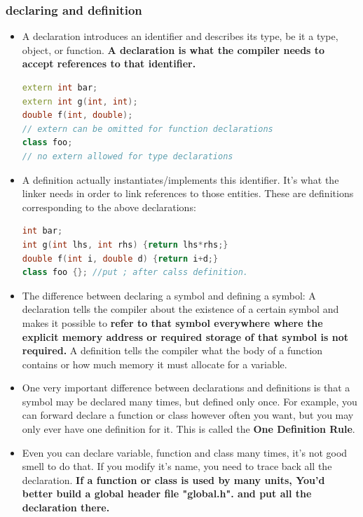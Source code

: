 \documentclass[a4paper,12pt,twoside]{book}
\begin{document}
\subsubsection{declaring and definition}
\begin{itemize}

\item A declaration introduces an identifier and describes its type, be it a type, object, or function. \textbf{A declaration is what the compiler needs to accept references to that identifier.} 
\begin{lstlisting}[frame=single, language=c++]
extern int bar;
extern int g(int, int);
double f(int, double); 
// extern can be omitted for function declarations
class foo; 
// no extern allowed for type declarations
\end{lstlisting}

\item A definition actually instantiates/implements this identifier. It's what the linker needs in order to link references to those entities. These are definitions corresponding to the above declarations:
\begin{lstlisting}[frame=single, language=c++]
int bar;
int g(int lhs, int rhs) {return lhs*rhs;}
double f(int i, double d) {return i+d;}
class foo {}; //put ; after calss definition.
\end{lstlisting}

\item The difference between declaring a symbol and defining a symbol: A declaration tells the compiler about the existence of a certain symbol and makes it possible to \textbf{refer to that symbol everywhere where the explicit memory address or required storage of that symbol is not required.} A definition tells the compiler what the body of a function contains or how much memory it must allocate for a variable.

\item One very important difference between declarations and definitions is that a symbol may be declared many times, but defined only once. For example, you can forward declare a function or class however often you want, but you may only ever have one definition for it. This is called the \textbf{One Definition Rule}.

\item Even you can declare variable, function and class many times, it's not good smell to do that.  If you modify it's name, you need to trace back all the declaration. \textbf{If a function or class is used by many units, You'd better build a global header file "global.h". and put all the declaration there.} 



\end{itemize}
\end{document}
